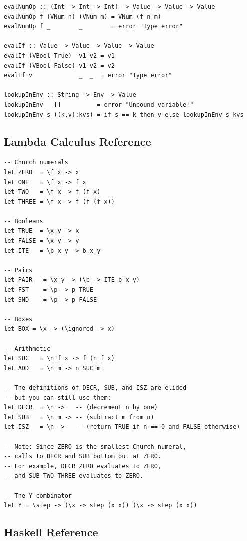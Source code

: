 \documentclass[addpoints]{exam}
\begin{document}
\begin{questions}
\begin{verbatim}
evalNumOp :: (Int -> Int -> Int) -> Value -> Value -> Value
evalNumOp f (VNum n) (VNum m) = VNum (f n m)
evalNumOp f _        _        = error "Type error"

evalIf :: Value -> Value -> Value -> Value
evalIf (VBool True)  v1 v2 = v1
evalIf (VBool False) v1 v2 = v2
evalIf v             _  _  = error "Type error"

lookupInEnv :: String -> Env -> Value
lookupInEnv _ []          = error "Unbound variable!"
lookupInEnv s ((k,v):kvs) = if s == k then v else lookupInEnv s kvs
\end{verbatim}

\end{questions}

\newpage

\subsection*{Lambda Calculus Reference}

\begin{verbatim}
-- Church numerals
let ZERO  = \f x -> x
let ONE   = \f x -> f x
let TWO   = \f x -> f (f x)
let THREE = \f x -> f (f (f x))

-- Booleans
let TRUE  = \x y -> x
let FALSE = \x y -> y
let ITE   = \b x y -> b x y

-- Pairs
let PAIR   = \x y -> (\b -> ITE b x y)
let FST    = \p -> p TRUE
let SND    = \p -> p FALSE

-- Boxes
let BOX = \x -> (\ignored -> x)

-- Arithmetic
let SUC   = \n f x -> f (n f x)
let ADD   = \n m -> n SUC m

-- The definitions of DECR, SUB, and ISZ are elided
-- but you can still use them:
let DECR  = \n ->   -- (decrement n by one)
let SUB   = \n m -> -- (subtract m from n)
let ISZ   = \n ->   -- (return TRUE if n == 0 and FALSE otherwise)

-- Note: Since ZERO is the smallest Church numeral,
-- calls to DECR and SUB bottom out at ZERO.
-- For example, DECR ZERO evaluates to ZERO,
-- and SUB TWO THREE evaluates to ZERO.

-- The Y combinator
let Y = \step -> (\x -> step (x x)) (\x -> step (x x))
\end{verbatim}

\newpage

\subsection*{Haskell Reference}
\end{document}
